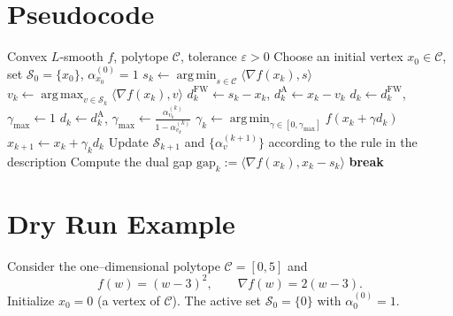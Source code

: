 \documentclass{article}
\newcommand{\cC}{\mathcal{C}}
\newcommand{\gap}{\mathrm{gap}}
\newcommand{\argmin}{\operatorname*{arg\,min}}
\newcommand{\argmax}{\operatorname*{arg\,max}}
\begin{document}
\section*{Pseudocode}
\begin{algorithm}[H]
\caption{Away-Step Frank–Wolfe (AFW)}
\begin{algorithmic}[1]
\Require Convex $L$‑smooth $f$, polytope $\cC$, tolerance $\varepsilon>0$
\State Choose an initial vertex $x_0\in\cC$, set $\mathcal{S}_0=\{x_0\}$, $\alpha^{(0)}_{x_0}=1$
    \State $\displaystyle s_k\gets\argmin_{s\in\cC}\langle\nabla f(x_k),s\rangle$
    \State $\displaystyle v_k\gets\argmax_{v\in\mathcal{S}_k}\langle\nabla f(x_k),v\rangle$
    \State $d^{\text{FW}}_k\gets s_k-x_k$, \; $d^{\text{A}}_k\gets x_k-v_k$
        \State $d_k\gets d^{\text{FW}}_k$, $\gamma_{\max}\gets 1$
    \Else
        \State $d_k\gets d^{\text{A}}_k$, $\displaystyle\gamma_{\max}\gets\frac{\alpha^{(k)}_{v_k}}{1-\alpha^{(k)}_{v_k}}$
    \EndIf
    \State $\displaystyle\gamma_k\gets\argmin_{\gamma\in[0,\gamma_{\max}]} f(x_k+\gamma d_k)$
    \State $x_{k+1}\gets x_k+\gamma_k d_k$
    \State Update $\mathcal{S}_{k+1}$ and $\{\alpha^{(k+1)}_v\}$ according to the rule in the description
    \State Compute the dual gap $\gap_k:=\langle\nabla f(x_k),x_k-s_k\rangle$
    \If{$\gap_k\le\varepsilon$}
        \State \textbf{break}
    \EndIf
\EndFor
\end{algorithmic}
\end{algorithm}

\section*{Dry Run Example}
Consider the one–dimensional polytope $\cC=[0,5]$ and
\[
f(w)=(w-3)^2,\qquad \nabla f(w)=2(w-3).
\]
Initialize $x_0=0$ (a vertex of $\cC$).  
The active set $\mathcal{S}_0=\{0\}$ with $\alpha^{(0)}_{0}=1$.
\end{document}
